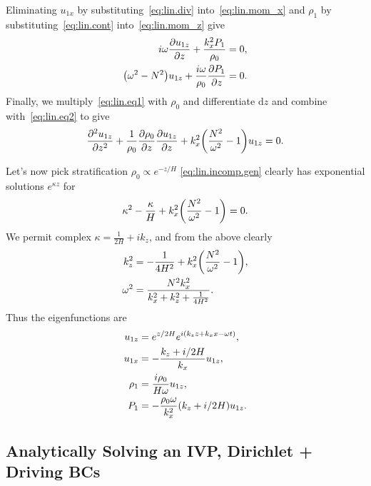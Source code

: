 \documentclass[11pt,
        usenames, %
        dvipsnames %
    ]{report}
\newcommand*{\pd}[2]{\frac{\partial#1}{\partial#2}}
\newcommand*{\ptd}[2]{\frac{\partial^2 #1}{\partial#2^2}}
\DeclarePairedDelimiter\p{\lparen}{\rparen}
\begin{document}
Eliminating $u_{1x}$ by substituting~\eqref{eq:lin.div}
into~\eqref{eq:lin.mom_x} and $\rho_1$ by substituting~\eqref{eq:lin.cont}
into~\eqref{eq:lin.mom_z} give
\begin{subequations}
    \begin{align}
        i\omega \pd{u_{1z}}{z} + \frac{k_x^2 P_1}{\rho_0} &= 0,
            \label{eq:lin.eq1}\\
        \p*{\omega^2 - N^2 }u_{1z} + \frac{i\omega}{\rho_0}\pd{P_1}{z} &= 0.
            \label{eq:lin.eq2}
    \end{align}
\end{subequations}
Finally, we multiply~\eqref{eq:lin.eq1} with $\rho_0$ and differentiate
$\mathrm{d}z$ and combine with~\eqref{eq:lin.eq2} to give
\begin{equation}
    \ptd{u_{1z}}{z} + \frac{1}{\rho_0}\pd{\rho_0}{z}\pd{u_{1z}}{z}
        + k_x^2\p*{\frac{N^2}{\omega^2} - 1}u_{1z} = 0.\label{eq:lin.incomp.gen}
\end{equation}

Let's now pick stratification $\rho_0 \propto e^{-z/H}$
\autoref{eq:lin.incomp.gen} clearly has exponential solutions $e^{\kappa z}$ for
\begin{equation}
    \kappa^2 - \frac{\kappa}{H} + k_x^2\p*{\frac{N^2}{\omega^2} - 1} = 0.
\end{equation}
We permit complex $\kappa = \frac{1}{2H} + ik_z$, and from the above clearly
\begin{align}
    k_z^2 &= -\frac{1}{4H^2} + k_x^2\p*{\frac{N^2}{\omega^2} - 1},\nonumber\\
    \omega^2 &= \frac{N^2k_x^2}{k_x^2 + k_z^2 +
        \frac{1}{4H^2}}.\label{eq:strat_disp}
\end{align}
Thus the eigenfunctions are
\begin{equation}
    \begin{split}
        u_{1z} &= e^{z/2H} e^{i(k_zz + k_xx - \omega t)},\\
        u_{1x} &= -\frac{k_z + i/2H}{k_x} u_{1z},\\
        \rho_1 &= \frac{i \rho_0}{H\omega} u_{1z},\\
        P_1 &= -\frac{\rho_0 \omega}{k_x^2}\p*{k_z + i/2H}u_{1z}.
    \end{split}\label{eq:strat_eigens}
\end{equation}

\subsection{Analytically Solving an IVP, Dirichlet + Driving BCs}
\end{document}
